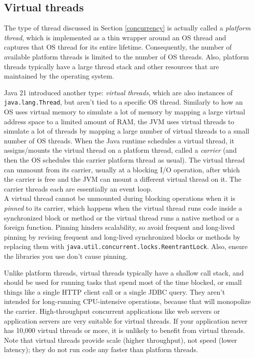 \documentclass[table, xcdraw]{article}%
\begin{document}
\subsection{Virtual threads}

The type of thread discussed in Section \ref{concurrency} is actually called a \emph{platform thread}, which is implemented as a thin wrapper around an OS thread and captures that OS thread for its entire lifetime. Consequently, the number of available platform threads is limited to the number of OS threads. Also, platform threads typically have a large thread stack and other resources that are maintained by the operating system.

Java 21 introduced another type: \emph{virtual threads}, which are also instances of \texttt{java.lang.Thread}, but aren't tied to a specific OS thread. Similarly to how an OS uses virtual memory to simulate a lot of memory by mapping a large virtual address space to a limited amount of RAM, the JVM uses virtual threads to simulate a lot of threads by mapping a large number of virtual threads to a small number of OS threads. When the Java runtime schedules a virtual thread, it assigns/mounts the virtual thread on a platform thread, called a \emph{carrier} (and then the OS schedules this carrier platform thread as usual). The virtual thread can unmount from its carrier, usually at a blocking I/O operation, after which the carrier is free and the JVM can mount a different virtual thread on it. The carrier threads each are essentially an event loop.\\
A virtual thread cannot be unmounted during blocking operations when it is \emph{pinned} to its carrier, which happens when the virtual thread runs code inside a synchronized block or method or the virtual thread runs a native method or a foreign function. Pinning hinders scalability, so avoid frequent and long-lived pinning by revising frequent and long-lived synchronized blocks or methods by replacing them with \texttt{java.util.concurrent.locks.ReentrantLock}. Also, ensure the libraries you use don't cause pinning.

Unlike platform threads, virtual threads typically have a shallow call stack, and should be used for running tasks that spend most of the time blocked, or small things like a single HTTP client call or a single JDBC query. They aren't intended for long-running CPU-intensive operations, because that will monopolize the carrier. High-throughput concurrent applications like web servers or application servers are very suitable for virtual threads. If your application never has 10,000 virtual threads or more, it is unlikely to benefit from virtual threads. Note that virtual threads provide scale (higher throughput), not speed (lower latency); they do not run code any faster than platform threads.
\end{document}
